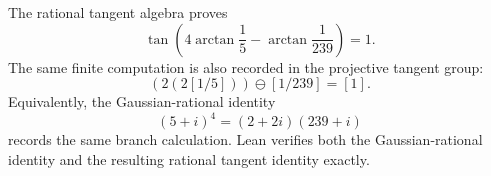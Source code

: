 \begin{theorem}\label{thm:machin-tangent}
The rational tangent algebra proves
\[
  \tan\!\left(4\arctan\frac15-\arctan\frac{1}{239}\right)=1.
\]
The same finite computation is also recorded in the projective tangent group:
\[
  (2(2[1/5]))\ominus[1/239]=[1].
\]
Equivalently, the Gaussian-rational identity
\[
  (5+i)^4=(2+2i)(239+i)
\]
records the same branch calculation.
Lean verifies both the Gaussian-rational identity and the resulting rational
tangent identity exactly.
\end{theorem}

